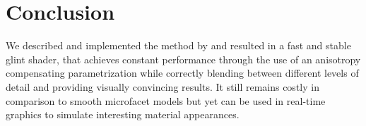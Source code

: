 \section{Conclusion}
\label{sec:conclusion}

We described and implemented the method by \textcite{deliot2023} and resulted in a fast and stable glint shader, that achieves constant performance through the use of an anisotropy compensating parametrization while correctly blending between different levels of detail and providing visually convincing results.
%
It still remains costly in comparison to smooth microfacet models but yet can be used in real-time graphics to simulate interesting material appearances.